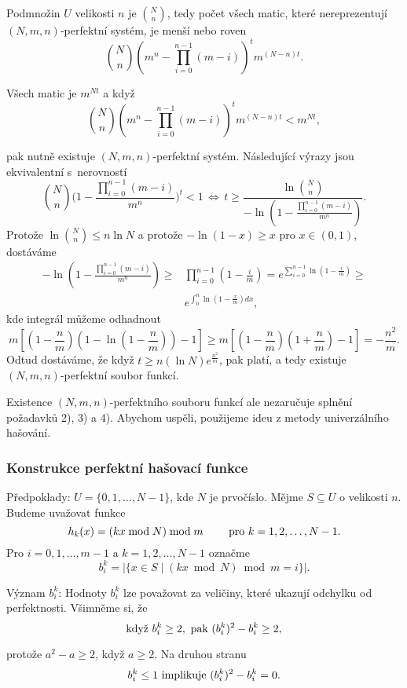 \documentclass[a4paper,12pt]{article}
\begin{document}
Podmnožin $U$ velikosti $n$ je $\binom Nn$, tedy počet všech 
matic, které nereprezentují $(N,m,n)$-perfektní systém, je 
menší nebo roven  
$$\binom Nn(m^n-\prod_{i=0}^{n-1}(m-i))^tm^{(N-n)t}.$$

Všech matic je $m^{Nt}$ a když 
\begin{equation*}\tag{\*}\binom Nn(m^n-\prod_{i=0}^{n-1}(m-i))^tm^{(N-n)t}<m^{Nt},\end{equation*}

pak nutně existuje $(N,m,n)$-perfektní systém. 
Následující vý\-ra\-zy jsou ekvivalentní s~ne\-rov\-ností 
\thetag{$*$}
$$\binom Nn\big(1-\frac {\prod_{i=0}^{n-1}(m-i)}{m^n}\big)^t<1\,\Leftrightarrow\,
t\ge\frac {\ln\binom Nn}{-\ln(1-\frac {\prod_{i=0}^{n-1}(m-i)}{m^
n})}.$$
Protože $\ln\binom Nn\le n\ln N$ a protože $-\ln(1-x)\ge x$ pro $
x\in (0,1)$, dostáváme
\begin{align*}-\ln(1-\frac {\prod_{i=0}^{n-1}(m-i)}{m^n})\ge&\prod_{i=0}^{
n-1}(1-\frac im)=e^{\sum_{i=0}^{n-1}\ln(1-\frac im)}\ge\\
&e^{\int_0^n\ln(1-\frac xm)dx},\end{align*}
kde integrál můžeme odhadnout 
$$m[(1-\frac nm)(1-\ln(1-\frac nm))-1]\ge m[(1-\frac nm)(1+\frac 
nm)-1]=-\frac {n^2}m.$$
Odtud dostáváme, že když $t\ge n(\ln N)e^{\frac {n^2}m}$, pak \thetag{*} platí, a tedy 
existuje $(N,m,n)$-perfektní soubor funkcí. 

Existence $(N,m,n)$-perfektního souboru funkcí ale 
nezaručuje splnění požadavků 2), 3) a 4).  
Abychom uspěli, použijeme ideu z metody univerzálního 
hašování.  

\subsubsection{Konstrukce perfektní hašovací funkce}

Předpoklady:  $U=\{0,1,\dots,N-1\}$, kde $N$ je 
prvočíslo.  Mějme $S\subseteq U$ o velikosti $n$.  Budeme 
uvažovat funkce 
$$h_k(x)=(kx\bmod N)\bmod m\qquad\text{\rm\ pro }k=1,2,\dots,N-1.$$
Pro $i=0,1,\dots,m-1$ a $k=1,2,\dots,N-1$ označme 
$$b_i^k=|\{x\in S\mid (kx\bmod N)\bmod m=i\}|.$$

Význam $b_i^k$: Hodnoty $b_i^k$ lze považovat za 
veličiny, které ukazují odchylku od perfektnosti. 
Všimněme si, že 
$$\text{\rm když }b_i^k\ge 2,\text{\rm\ pak }(b_i^k)^2-b_i^k\ge 
2,$$

protože $a^2-a\ge 2$, když $a\ge 2$. Na druhou stranu 
$$b_i^k\le 1\text{\rm\ implikuje }(b_i^k)^2-b_i^k=0.$$
\end{document}
